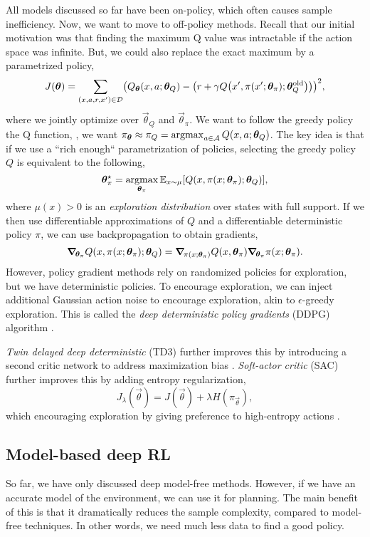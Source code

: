 All models discussed so far have been on-policy, which often causes sample
inefficiency. Now, we want to move to off-policy methods. Recall that our
initial motivation was that finding the maximum Q value was intractable if the
action space was infinite. But, we could also replace the exact maximum by a
parametrized policy, \[
  J(\vec{\theta}) = \sum_{(x,a,r,x')\in \mathcal{D}} \lft( Q_{\vec{\theta}}(x,a; \vec{\theta}_Q) - \lft( r + \gamma Q \lft( x', \pi(x'; \vec{\theta}_\pi); \vec{\theta}_Q^{\text{old}} \rgt) \rgt) \rgt)^2,
\]
where we jointly optimize over $\vec{\theta}_Q$ and $\vec{\theta}_\pi$. We want
to follow the greedy policy \wrt the Q function, \ie, we want
$\pi_{\vec{\theta}} \approx \pi_Q = \argmax_{a\in\mathcal{A}}
Q(x,a;\vec{\theta}_Q)$. The key idea is that if we use a ``rich enough``
parametrization of policies, selecting the greedy policy \wrt $Q$ is
equivalent to the following, \[
  \vec{\theta}_\pi^\star = \argmax_{\vec{\theta}_\pi} \E_{x\sim \mu} [Q(x, \pi(x; \vec{\theta}_\pi); \vec{\theta}_Q)],
\]
where $\mu(x) > 0$ is an \textit{exploration distribution} over states with
full support. If we then use differentiable approximations of $Q$ and a
differentiable deterministic policy $\pi$, we can use backpropagation to obtain
gradients, \[
  \grad{Q(x, \pi(x; \vec{\theta}_\pi); \vec{\theta}_Q)}{\vec{\theta}_\pi} = \grad{Q(x,\vec{\theta}_\pi)}{\pi(x; \vec{\theta}_\pi)} \grad{\pi(x; \vec{\theta}_\pi)}{\vec{\theta}_\pi}.
\]
However, policy gradient methods rely on randomized policies for exploration,
but we have deterministic policies. To encourage exploration, we can inject
additional Gaussian action noise to encourage exploration, akin to
$\epsilon$-greedy exploration. This is called the \textit{deep deterministic
policy gradients} (DDPG) algorithm \citep{lillicrap2015continuous}.

\textit{Twin delayed deep deterministic} (TD3) further improves this by
introducing a second critic network to address maximization bias
\citep{fujimoto2018addressing}. \textit{Soft-actor critic} (SAC) further
improves this by adding entropy regularization, \[
  J_{\lambda}(\vec{\theta}) = J(\vec{\theta}) + \lambda H(\pi_{\vec{\theta}}),
\]
which encouraging exploration by giving preference to high-entropy actions
\citep{haarnoja2018soft}.

\subsection{Model-based deep RL}

So far, we have only discussed deep model-free methods. However, if we have an
accurate model of the environment, we can use it for planning. The main benefit
of this is that it dramatically reduces the sample complexity, compared to
model-free techniques. In other words, we need much less data to find a good
policy.

